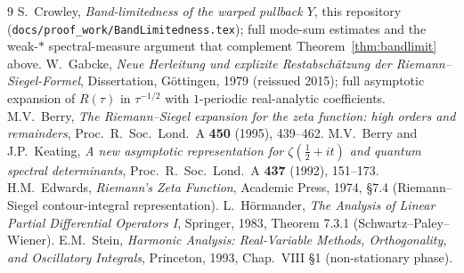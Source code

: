 \documentclass[11pt]{article}
\theoremstyle{definition}
\begin{document}
\begin{thebibliography}{9}
 S.\ Crowley, \emph{Band-limitedness of the warped pullback \(Y\)}, this repository (\texttt{docs/proof\_work/BandLimitedness.tex}); full mode-sum estimates and the weak-\(*\) spectral-measure argument that complement Theorem~\ref{thm:bandlimit} above.
 W.\ Gabcke, \emph{Neue Herleitung und explizite Restabsch\"atzung der Riemann--Siegel-Formel}, Dissertation, G\"ottingen, 1979 (reissued 2015); full asymptotic expansion of \(R(\tau)\) in \(\tau^{-1/2}\) with \(1\)-periodic real-analytic coefficients.
 M.V.\ Berry, \emph{The Riemann--Siegel expansion for the zeta function: high orders and remainders}, Proc.\ R.\ Soc.\ Lond.\ A \textbf{450} (1995), 439--462.
 M.V.\ Berry and J.P.\ Keating, \emph{A new asymptotic representation for \(\zeta(\tfrac12+it)\) and quantum spectral determinants}, Proc.\ R.\ Soc.\ Lond.\ A \textbf{437} (1992), 151--173.
 H.M.\ Edwards, \emph{Riemann's Zeta Function}, Academic Press, 1974, \S7.4 (Riemann--Siegel contour-integral representation).
 L.\ H\"ormander, \emph{The Analysis of Linear Partial Differential Operators I}, Springer, 1983, Theorem 7.3.1 (Schwartz--Paley--Wiener).
 E.M.\ Stein, \emph{Harmonic Analysis: Real-Variable Methods, Orthogonality, and Oscillatory Integrals}, Princeton, 1993, Chap.~VIII \S1 (non-stationary phase).
\end{thebibliography}
\end{document}
